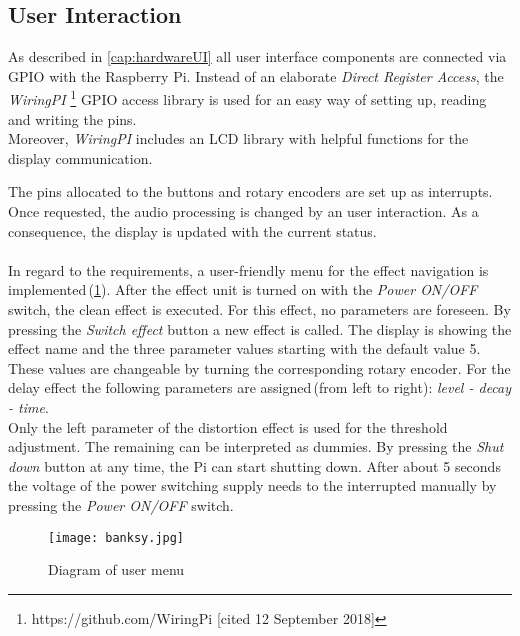 \subsection{User Interaction}

As described in \ref{cap:hardwareUI} all user interface components are connected via GPIO with the Raspberry Pi. Instead of an elaborate \textit{Direct Register Access}, the \textit{WiringPI} \footnote{https://github.com/WiringPi [cited 12 September 2018]} GPIO access library is used for an easy way of setting up, reading and writing the pins.\\
Moreover, \textit{WiringPI} includes an LCD library with helpful functions for the display communication. 

The pins allocated to the buttons and rotary encoders are set up as interrupts. Once requested, the audio processing is changed by an user interaction. As a consequence, the display is updated with the current status.\\
\\
In regard to the requirements, a user-friendly menu for the effect navigation is implemented\,(\ref{fig:Menu}).
After the effect unit is turned on with the \textit{Power ON/OFF} switch, the clean effect is executed. For this effect, no parameters are foreseen.
By pressing the \textit{Switch effect} button a new effect is called.
The display is showing the effect name and the three parameter values starting with the default value 5. These values are changeable by turning the corresponding rotary encoder.
For the delay effect the following parameters are assigned\,(from left to right): \textit{level - decay - time}.\\
Only the left parameter of the distortion effect is used for the threshold adjustment. The remaining can be interpreted as dummies. 
By pressing the \textit{Shut down} button at any time, the Pi can start shutting down. After about 5 seconds the voltage of the power switching supply needs to the interrupted manually by pressing the \textit{Power ON/OFF} switch.

\begin{figure}[H]
	\centering \texttt{[image: banksy.jpg]}
	\caption[Menu]{Diagram of user menu}
	\label{fig:Menu}
\end{figure}




